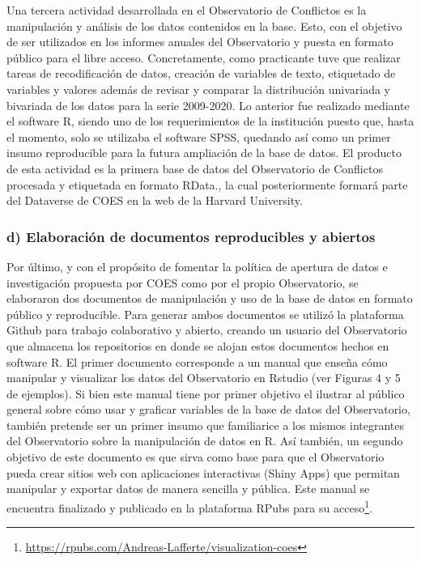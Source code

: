 \documentclass[
  12pt,
]{article}
\begin{document}
Una tercera actividad desarrollada en el Observatorio de Conflictos es
la manipulación y análisis de los datos contenidos en la base. Esto, con
el objetivo de ser utilizados en los informes anuales del Observatorio y
puesta en formato público para el libre acceso. Concretamente, como
practicante tuve que realizar tareas de recodificación de datos,
creación de variables de texto, etiquetado de variables y valores además
de revisar y comparar la distribución univariada y bivariada de los
datos para la serie 2009-2020. Lo anterior fue realizado mediante el
software R, siendo uno de los requerimientos de la institución puesto
que, hasta el momento, solo se utilizaba el software SPSS, quedando así
como un primer insumo reproducible para la futura ampliación de la base
de datos. El producto de esta actividad es la primera base de datos del
Observatorio de Conflictos procesada y etiquetada en formato RData., la
cual posteriormente formará parte del Dataverse de COES en la web de la
Harvard University.

\hypertarget{d-elaboraciuxf3n-de-documentos-reproducibles-y-abiertos}{%
\subsubsection{d) Elaboración de documentos reproducibles y
abiertos}\label{d-elaboraciuxf3n-de-documentos-reproducibles-y-abiertos}}

\doublespacing

Por último, y con el propósito de fomentar la política de apertura de
datos e investigación propuesta por COES como por el propio
Observatorio, se elaboraron dos documentos de manipulación y uso de la
base de datos en formato público y reproducible. Para generar ambos
documentos se utilizó la plataforma Github para trabajo colaborativo y
abierto, creando un usuario del Observatorio que almacena los
repositorios en donde se alojan estos documentos hechos en software R.
El primer documento corresponde a un manual que enseña cómo manipular y
visualizar los datos del Observatorio en Rstudio (ver Figuras 4 y 5 de
ejemplos). Si bien este manual tiene por primer objetivo el ilustrar al
público general sobre cómo usar y graficar variables de la base de datos
del Observatorio, también pretende ser un primer insumo que familiarice
a los mismos integrantes del Observatorio sobre la manipulación de datos
en R. Así también, un segundo objetivo de este documento es que sirva
como base para que el Observatorio pueda crear sitios web con
aplicaciones interactivas (Shiny Apps) que permitan manipular y exportar
datos de manera sencilla y pública. Este manual se encuentra finalizado
y publicado en la plataforma RPubs para su acceso\footnote{\url{https://rpubs.com/Andreas-Lafferte/visualization-coes}}.
\end{document}
